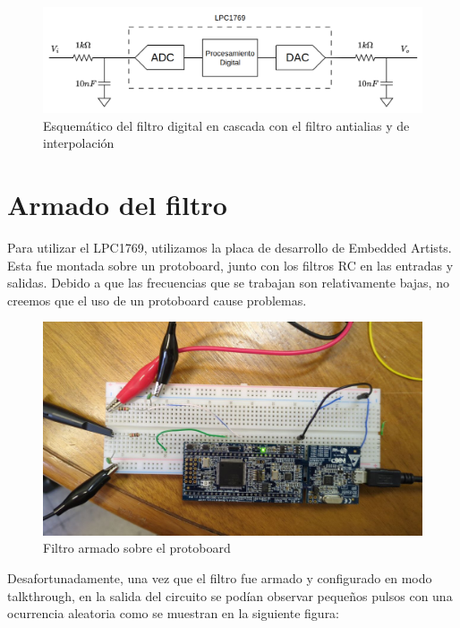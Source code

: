 \documentclass[11pt,a4paper]{report}
\begin{document}
\begin{figure}[h]
    \centering
    \includegraphics[scale=0.4]{figs/filtro_sch.png}
    \caption{Esquemático del filtro digital en cascada con el filtro antialias y de interpolación}
\end{figure}

\chapter{Armado del filtro}

Para utilizar el LPC1769, utilizamos la placa de desarrollo de Embedded Artists. Esta fue montada sobre un protoboard, junto con los filtros RC en las entradas y salidas. Debido a que las frecuencias que se trabajan son relativamente bajas, no creemos que el uso de un protoboard cause problemas.



\begin{figure}[h]
    \centering
    \includegraphics[scale=0.25]{figs/filtro_armado.jpg}
    \caption{Filtro armado sobre el protoboard}
\end{figure}

Desafortunadamente, una vez que el filtro fue armado y configurado en modo talkthrough, en la salida del circuito se podían observar pequeños pulsos con una ocurrencia aleatoria como se muestran en la siguiente figura:
\end{document}
